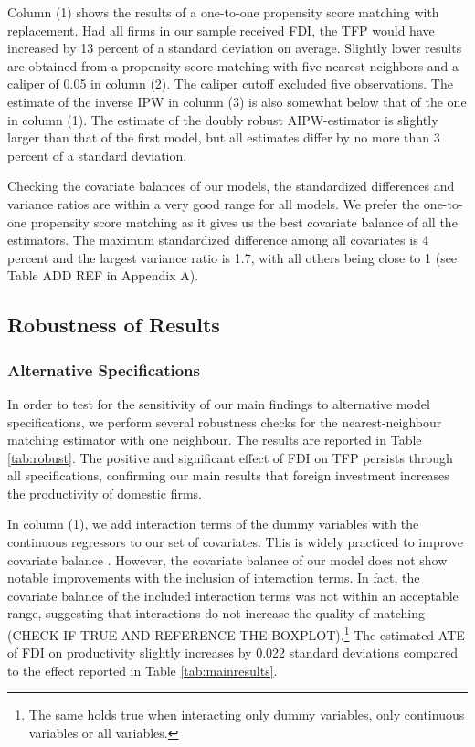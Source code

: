 \documentclass[a4paper,11pt]{scrartcl}
\begin{document}
Column (1) shows the results of a one-to-one propensity score matching with replacement. Had all firms in our sample received FDI, the TFP would have increased by 13 percent of a standard deviation on average. Slightly lower results are obtained from a propensity score matching with five nearest neighbors and a caliper of 0.05 in column (2). The caliper cutoff excluded five observations. The estimate of the inverse IPW in column (3) is also somewhat below that of the one in column (1). The estimate of the doubly robust AIPW-estimator is slightly larger than that of the first model, but all estimates differ by no more than 3 percent of a standard deviation.

Checking the covariate balances of our models, the standardized differences and variance ratios are within a very good range for all models. We prefer the one-to-one propensity score matching as it gives us the best covariate balance of all the estimators. The maximum standardized difference among all covariates is 4 percent and the largest variance ratio is 1.7, with all others being close to 1 (see Table ADD REF in Appendix A). 


\subsection{Robustness of Results}

\subsubsection*{Alternative Specifications} 
In order to test for the sensitivity of our main findings to alternative model specifications, we perform several robustness checks for the nearest-neighbour matching estimator with one neighbour. The results are reported in Table \ref{tab:robust}. The positive and significant effect of FDI on TFP persists through all specifications, confirming our main results that foreign investment increases the productivity of domestic firms. 

In column (1), we add interaction terms of the dummy variables with the continuous regressors to our set of covariates. This is widely practiced to improve covariate balance \citep{Caliendo08}.
However, the covariate balance of our model does not show notable improvements with the inclusion of interaction terms. In fact, the covariate balance of the included interaction terms was not within an acceptable range, suggesting that interactions do not increase the quality of matching (CHECK IF TRUE AND REFERENCE THE BOXPLOT).\footnote{The same holds true when interacting only dummy variables, only continuous variables or all variables.} The estimated ATE of FDI on productivity slightly increases by 0.022 standard deviations compared to the effect reported in Table \ref{tab:mainresults}. 
\end{document}
